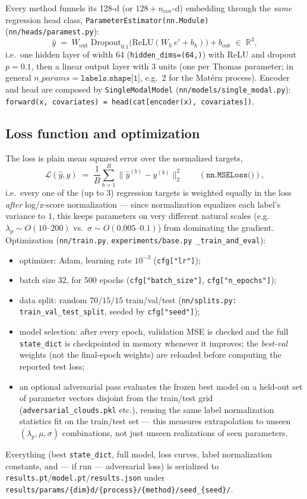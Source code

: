 \documentclass[11pt]{article}
\begin{document}
Every method funnels its 128-d (or $128{+}n_\text{cov}$-d) embedding through
the \emph{same} regression head class,
\texttt{ParameterEstimator(nn.Module)} (\texttt{nn/heads/paramest.py}):
\[
  \hat y \;=\; W_\text{out}\;
    \mathrm{Dropout}_{0.1}\!\big(\mathrm{ReLU}(W_h\, e' + b_h)\big) + b_\text{out}
  \;\in\; \mathbb R^{3},
\]
i.e.\ one hidden layer of width 64 (\texttt{hidden\_dims=(64,)}) with ReLU
and dropout $p=0.1$, then a linear output layer with $3$ units (one per
Thomas parameter; in general $n\_params=\texttt{labels.shape[1]}$, e.g.\ $2$
for the Matérn process). Encoder and head are composed by
\texttt{SingleModalModel} (\texttt{nn/models/single\_modal.py}):
\texttt{forward(x, covariates) = head(cat[encoder(x), covariates])}.

\subsection{Loss function and optimization}

The loss is plain mean squared error over the normalized targets,
\[
  \mathcal L(\hat y, y) \;=\; \frac{1}{B}\sum_{b=1}^{B}\lVert \hat y^{(b)} - y^{(b)}\rVert_2^2
  \qquad (\texttt{nn.MSELoss()}),
\]
i.e.\ every one of the (up to 3) regression targets is weighted equally in
the loss \emph{after} log/z-score normalization — since normalization
equalizes each label's variance to $1$, this keeps parameters on very
different natural scales (e.g.\ $\lambda_p\sim O(10\text{--}200)$ vs.\
$\sigma\sim O(0.005\text{--}0.1)$) from dominating the gradient.
Optimization (\texttt{nn/train.py}, \texttt{experiments/base.py
\_train\_and\_eval}):
\begin{itemize}
  \item optimizer: Adam, learning rate $10^{-3}$ (\texttt{cfg["lr"]});
  \item batch size 32, for 500 epochs (\texttt{cfg["batch\_size"]},
    \texttt{cfg["n\_epochs"]});
  \item data split: random $70/15/15$ train/val/test
    (\texttt{nn/splits.py: train\_val\_test\_split}, seeded by
    \texttt{cfg["seed"]});
  \item model selection: after every epoch, validation MSE is checked and
    the full \texttt{state\_dict} is checkpointed in memory whenever it
    improves; the \emph{best-val} weights (not the final-epoch weights) are
    reloaded before computing the reported test loss;
  \item an optional adversarial pass evaluates the frozen best model on a
    held-out set of parameter vectors disjoint from the train/test grid
    (\texttt{adversarial\_clouds.pkl} etc.), reusing the same label
    normalization statistics fit on the train/test set — this measures
    extrapolation to unseen $(\lambda_p,\mu,\sigma)$ combinations, not just
    unseen realizations of seen parameters.
\end{itemize}
Everything (best \texttt{state\_dict}, full model, loss curves, label
normalization constants, and — if run — adversarial loss) is serialized to
\texttt{results.pt}/\texttt{model.pt}/\texttt{results.json} under
\texttt{results/params/\{dim\}d/\{process\}/\{method\}/seed\_\{seed\}/}.
\end{document}
